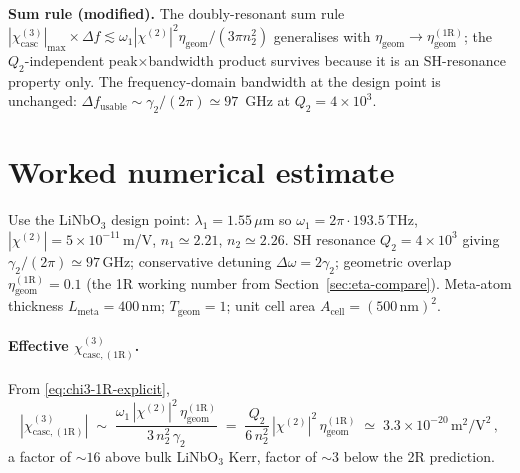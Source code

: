 \documentclass[11pt,a4paper]{article}
\newcommand{\chitwo}{\chi^{(2)}}
\newcommand{\chithree}{\chi^{(3)}}
\newcommand{\Dom}{\Delta\omega}
\newcommand{\chicascOneR}{\chi^{(3)}_{\text{casc},(1\mathrm R)}}
\begin{document}
\textbf{Sum rule (modified).}  The doubly-resonant sum rule
$|\chithree_\text{casc}|_\text{max}\!\times\!\Delta f\!\lesssim\!
\omega_1|\chitwo|^{2}\eta_\text{geom}/(3\pi n_2^{2})$ generalises with
$\eta_\text{geom}\to\eta_\text{geom}^{(1\mathrm R)}$; the $Q_2$-independent
peak$\times$bandwidth product survives because it is an SH-resonance
property only.  The frequency-domain bandwidth at the design point is
unchanged: $\Delta f_\text{usable}\sim\gamma_2/(2\pi)\simeq 97$~GHz at
$Q_2=4\!\times\!10^{3}$.

\section{Worked numerical estimate}\label{sec:numbers}

Use the LiNbO$_3$ design point: $\lambda_1=1.55\,\mu$m so $\omega_1=2\pi\cdot
193.5\,$THz, $|\chitwo|=5\!\times\!10^{-11}\,$m/V, $n_1\!\simeq\!2.21$,
$n_2\!\simeq\!2.26$.  SH resonance $Q_2=4\!\times\!10^{3}$ giving
$\gamma_2/(2\pi)\simeq 97\,$GHz; conservative detuning $\Dom=2\gamma_2$;
geometric overlap $\eta_\text{geom}^{(1\mathrm R)}=0.1$ (the 1R working
number from Section~\ref{sec:eta-compare}).  Meta-atom thickness
$L_\text{meta}=400$\,nm; $T_\text{geom}=1$; unit cell area
$A_\text{cell}=(500\,\text{nm})^{2}$.

\paragraph{Effective $\chicascOneR$.}
From \eqref{eq:chi3-1R-explicit},
\begin{equation}
  |\chicascOneR|
   \;\sim\;\frac{\omega_1\,|\chitwo|^{2}\,\eta_\text{geom}^{(1\mathrm R)}}
                  {3\,n_2^{2}\,\gamma_2}
   \;=\;\frac{Q_2}{6\,n_2^{2}}\,|\chitwo|^{2}\,\eta_\text{geom}^{(1\mathrm R)}
   \;\simeq\;3.3\!\times\!10^{-20}\,\mathrm{m^{2}/V^{2}}\,,
\end{equation}
a factor of $\sim 16$ above bulk LiNbO$_3$ Kerr, factor of $\sim 3$ below
the 2R prediction.
\end{document}
